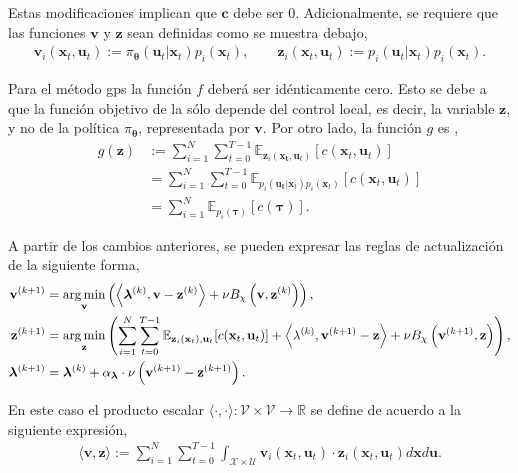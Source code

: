 Estas modificaciones implican que $\mathbf{c}$ debe ser 0. Adicionalmente, se requiere que las funciones $\mathbf{v}$ y $\mathbf{z}$ sean definidas como se muestra debajo,
\begin{align}
    \mathbf{v}_i(\mathbf{x}_t, \mathbf{u}_t) := \pi_{\bm\theta}(\mathbf{u}_t|\mathbf{x}_t) p_{i}(\mathbf{x}_t), \qquad
    \mathbf{z}_i(\mathbf{x}_t, \mathbf{u}_t) := p_i(\mathbf{u}_t|\mathbf{x}_t) p_{i}(\mathbf{x}_t).
\end{align}

Para el método \acrshort{gps} la función $f$ deberá ser idénticamente cero. Esto se debe a que la función objetivo de la  sólo depende del control local, es decir, la variable $\mathbf{z}$, y no de la política $\pi_{\bm\theta}$, representada por $\mathbf{v}$. Por otro lado, la función $g$ es \cite{Schneider2018}, 
\begin{equation}
\begin{aligned}
    g(\mathbf{z}) &:= \sum_{i=1}^{N}\sum_{t=0}^{T-1} \mathbb{E}_{\mathbf{z}_{i}(\mathbf{x_t}, \mathbf{u}_t)}[c(\mathbf{x}_t, \mathbf{u}_t)] \\
    &= \sum_{i=1}^{N}\sum_{t=0}^{T-1}\mathbb{E}_{p_i(\mathbf{u_t}|\mathbf{x}_t)p_{i}(\mathbf{x}_t)}[c(\mathbf{x}_t, \mathbf{u}_t)]\\
    &=  \sum_{i=1}^{N}\mathbb{E}_{p_i(\bm\tau)}[c(\bm\tau)].
\end{aligned}
\end{equation}

A partir de los cambios anteriores, se pueden expresar las reglas de actualización de la siguiente forma, 
\begin{align}
    \mathbf{v}^{(k+1)} &= \operatorname*{arg\,min}_{\mathbf{v}}\left( \left\langle \bm\lambda^{(k)}, \mathbf{v}-\mathbf{z}^{(k)}\right\rangle + \nu B_{\chi}\left(\mathbf{v}, \mathbf{z}^{(k)}\right)\right), \\
    \mathbf{z}^{(k+1)} &= \operatorname*{arg\,min}_{\mathbf{z}}\left( \sum_{i=1}^{N}\sum_{t=0}^{T-1}\mathbb{E}_{\mathbf{z}_{i}(\mathbf{x}_t), \mathbf{u}_t}[c(\mathbf{x}_t, \mathbf{u}_t)] + \left\langle \lambda^{(k)}, \mathbf{v}^{(k+1)}-\mathbf{z}\right\rangle + \nu B_{\chi}\left(\mathbf{v}^{(k+1)}, \mathbf{z}\right)\right), \\
    \bm \lambda^{(k+1)} &= \bm \lambda^{(k)} + \alpha_{\bm\lambda} \cdot \nu \left(\mathbf{v}^{(k+1)}-\mathbf{z}^{(k+1)}\right).
\end{align}

En este caso el producto escalar $\langle \cdot, \cdot \rangle: \mathcal{V}\times\mathcal{V} \rightarrow \mathbb{R}$ se define de acuerdo a la siguiente expresión,
\begin{align}
    \langle\mathbf{v}, \mathbf{z}\rangle := \sum_{i=1}^{N}\sum_{t=0}^{T-1}\int_{\mathcal{X}\times \mathcal{U}}\mathbf{v}_i(\mathbf{x}_t, \mathbf{u}_t) \cdot\mathbf{z}_i(\mathbf{x}_t, \mathbf{u}_t)d\mathbf{x}d\mathbf{u}. 
    \label{fun_prod}
\end{align}

